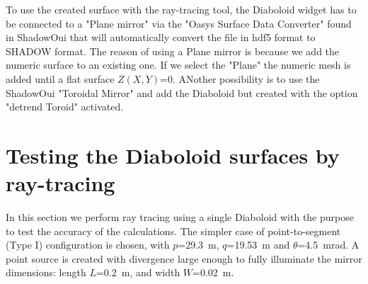 \documentclass[a4paper, 11pt]{article}
\begin{document}
To use the created surface with the ray-tracing tool, the Diaboloid widget has to be connected to a "Plane mirror" via the "Oasys Surface Data Converter" found in ShadowOui that will automatically convert the file in hdf5 format to SHADOW format. The reason of using a Plane mirror is because we add the numeric surface to an existing one. If we select the "Plane" the numeric mesh is added until a flat surface $Z(X,Y)$=0. ANother possibility is to use the ShadowOui "Toroidal Mirror" and add the Diaboloid but created with the option "detrend Toroid" activated.  

\section{Testing the Diaboloid surfaces by ray-tracing}
\label{sec:testing}

In this section we perform ray tracing using a single Diaboloid with the purpose to test the accuracy of the calculations. The simpler case of point-to-segment (Type I) configuration is chosen, with $p$=29.3~m, $q$=19.53~m and $\theta$=4.5~mrad. A point source is created with divergence large enough to fully illuminate the mirror dimensions: 
length $L$=0.2~m, and width $W$=0.02~m.
\end{document}
